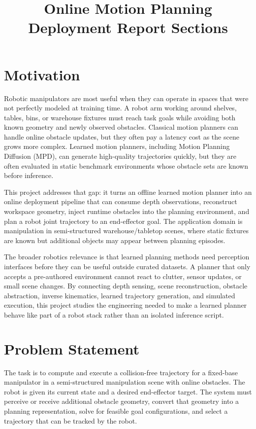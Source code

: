 \documentclass[11pt]{article}
\title{Online Motion Planning Deployment Report Sections}
\author{}
\date{}
\begin{document}
\maketitle

\section{Motivation}

Robotic manipulators are most useful when they can operate in spaces that were not perfectly modeled at training time. A robot arm working around shelves, tables, bins, or warehouse fixtures must reach task goals while avoiding both known geometry and newly observed obstacles. Classical motion planners can handle online obstacle updates, but they often pay a latency cost as the scene grows more complex. Learned motion planners, including Motion Planning Diffusion (MPD), can generate high-quality trajectories quickly, but they are often evaluated in static benchmark environments whose obstacle sets are known before inference.

This project addresses that gap: it turns an offline learned motion planner into an online deployment pipeline that can consume depth observations, reconstruct workspace geometry, inject runtime obstacles into the planning environment, and plan a robot joint trajectory to an end-effector goal. The application domain is manipulation in semi-structured warehouse/tabletop scenes, where static fixtures are known but additional objects may appear between planning episodes.

The broader robotics relevance is that learned planning methods need perception interfaces before they can be useful outside curated datasets. A planner that only accepts a pre-authored environment cannot react to clutter, sensor updates, or small scene changes. By connecting depth sensing, scene reconstruction, obstacle abstraction, inverse kinematics, learned trajectory generation, and simulated execution, this project studies the engineering needed to make a learned planner behave like part of a robot stack rather than an isolated inference script.

\section{Problem Statement}

The task is to compute and execute a collision-free trajectory for a fixed-base manipulator in a semi-structured manipulation scene with online obstacles. The robot is given its current state and a desired end-effector target. The system must perceive or receive additional obstacle geometry, convert that geometry into a planning representation, solve for feasible goal configurations, and select a trajectory that can be tracked by the robot.
\end{document}
